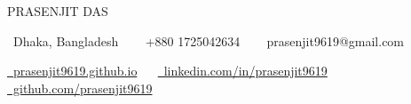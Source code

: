 \begingroup
\centering

{\LARGE\color{ACCENT_COLOR}\MakeUppercase{Prasenjit Das}}\par

{\fontsize{10pt}{12pt}\selectfont
  \raisebox{-0.1\height}\faHome\ Dhaka, Bangladesh
  ~~
  \raisebox{-0.1\height}\faPhone\ +880 1725042634 
  ~~ 
  \raisebox{-0.1\height}\faEnvelope\  prasenjit9619@gmail.com
}\par


{\fontsize{10pt}{12pt}\selectfont
  \href{https://prasenjit9619.github.io/portfolio/}{\raisebox{-0.1\height}\faGlobe\ prasenjit9619.github.io}
  ~~
  \href{https://www.linkedin.com/in/prasenjit9619/}{\raisebox{-0.1\height}\faLinkedin\ linkedin.com/in/prasenjit9619}
  ~~
  \href{https://github.com/prasenjit9619}{\raisebox{-0.1\height}\faGithub\ github.com/prasenjit9619}
}


\par
\endgroup
